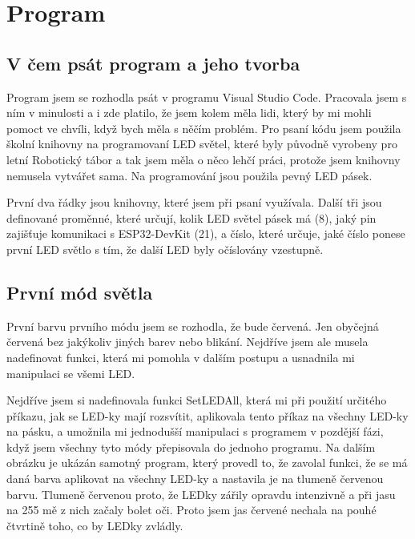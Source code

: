 \chapter{Program}

\section{V čem psát program a jeho tvorba}

Program jsem se rozhodla psát v programu Visual Studio Code.\cite{Visualstudio} Pracovala jsem s ním v minulosti a i zde platilo, že jsem kolem měla lidi, který by mi mohli pomoct ve chvíli, když bych měla s něčím problém. Pro psaní kódu jsem použila školní knihovny na programovaní LED světel, které byly původně vyrobeny pro letní Robotický tábor a tak jsem měla o něco lehčí práci, protože jsem knihovny nemusela vytvářet sama.  
Na programování jsou použila pevný LED pásek.


%



První dva řádky jsou knihovny, které jsem při psaní využívala. Další tři jsou definované proměnné, které určují, kolik LED světel pásek má (8), jaký pin zajišťuje komunikaci s ESP32-DevKit (21), a číslo, které určuje, jaké číslo ponese první LED světlo s tím,  že další LED byly očíslovány vzestupně.


\newpage

\section{První mód světla}
První barvu prvního módu jsem se rozhodla, že bude červená. Jen obyčejná červená bez jakýkoliv jiných barev nebo blikání. Nejdříve jsem ale musela nadefinovat funkci, která mi pomohla v dalším postupu a usnadnila mi manipulaci se všemi LED. 

%



Nejdříve jsem si nadefinovala funkci SetLEDAll, která mi při použití určitého příkazu, jak se LED-ky mají rozsvítit, aplikovala tento příkaz na všechny LED-ky na pásku, a umožnila mi jednodušší manipulaci s programem v pozdější fázi, když jsem všechny tyto módy přepisovala do jednoho programu. 
Na dalším obrázku %
 je ukázán samotný program, který provedl to, že zavolal funkci, že se má daná barva aplikovat na všechny LED-ky a nastavila je na tlumeně červenou barvu. Tlumeně červenou proto, že LEDky zářily opravdu intenzivně a při jasu na 255 mě z nich začaly bolet oči. Proto jsem jas červené nechala na pouhé čtvrtině toho, co by LEDky zvládly.

